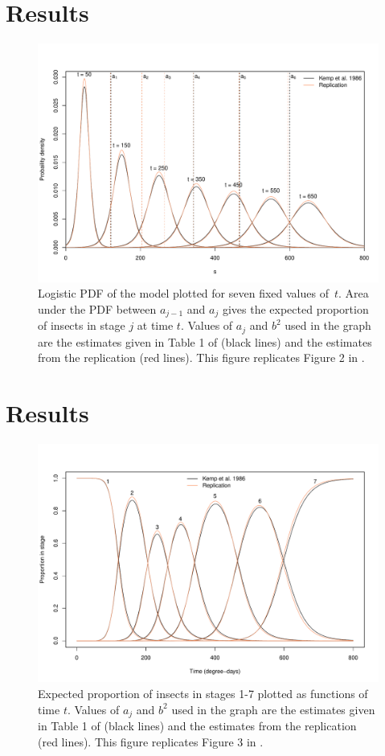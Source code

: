 \section{Results}
\begin{figure}[p]
  \centering
  \includegraphics[width=\textwidth]{../figures/dennis_fig2.pdf}
  \caption{Logistic PDF of the \citet{dennis1986stochastic} model plotted for seven fixed values of~$t$. Area under the PDF between $a_{j-1}$ and $a_j$ gives the expected proportion of insects in stage $j$ at time $t$. Values of $a_j$ and $b^2$ used in the graph are the estimates given in Table 1 of \citep{kemp1986stochastic} (black lines) and the estimates from the replication (red lines). This figure replicates Figure 2 in \citep{dennis1986stochastic}.}
  \label{fig:fig1}
\end{figure}

\section{Results}
\begin{figure}[p]
  \centering
  \includegraphics[width=\textwidth]{../figures/dennis_fig3.pdf}
  \caption{Expected proportion of insects in stages 1-7 plotted as functions of time $t$. Values of $a_j$ and $b^2$ used in the graph are the estimates given in Table 1 of \citep{kemp1986stochastic} (black lines) and the estimates from the replication (red lines). This figure replicates Figure 3 in \citep{dennis1986stochastic}.}
  \label{fig:fig2}
\end{figure}